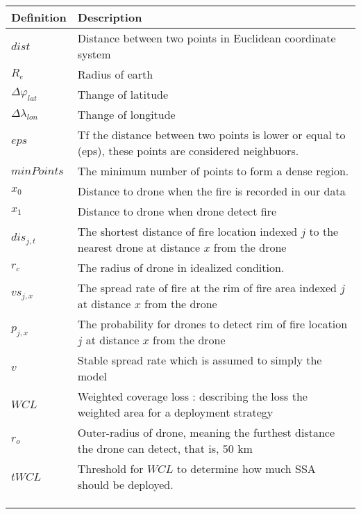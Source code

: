 \documentclass[../main]{subfiles}
\begin{document}
%


\begin{longtable}[]{@{}ll@{}}
	\toprule
	Definition & Description \\
	\midrule
	\endhead
	\(dist\) & Distance between two points in Euclidean coordinate system \\
	\(R_e\) & Radius of earth \\
	\(\Delta \varphi _{lat}\) & Thange of latitude \\
	\(\Delta \lambda _{lon}\) & Thange of longitude \\
	\(eps\) & Tf the distance between two points is lower or equal to (eps),
	these points are considered neighbuors. \\
	\(minPoints\) & The minimum number of points to form a dense region. \\
	\(x_0\) & Distance to drone when the fire is recorded in our data \\
	\(x_1\) & Distance to drone when drone detect fire \\
	\(dis_{j,t}\) & The shortest distance of fire location indexed \(j\) to
	the nearest drone at distance \(x\) from the drone \\
	\(r_c\) & The radius of drone in idealized condition. \\
	\(vs_{j,x} \) & The spread rate of fire at the rim of fire area indexed
	\(j\) at distance \(x\) from the drone  \\
	\(p_{j,x}\) & The probability for drones to detect rim of fire location
	\(j\) at distance \(x\) from the drone \\
	\(v\) & Stable spread rate which is assumed to simply the model \\
	\(WCL\) & Weighted coverage loss : describing the loss the weighted area
	for a deployment strategy \\
	\(r_o\) & Outer-radius of drone, meaning the furthest distance the drone
	can detect, that is, \(50\) km \\
	\(tWCL\) & Threshold for \(WCL\) to determine how much SSA should be
	deployed. \\
	& \\
	& \\
	& \\
	\bottomrule
	\end{longtable}
	

\end{document}
